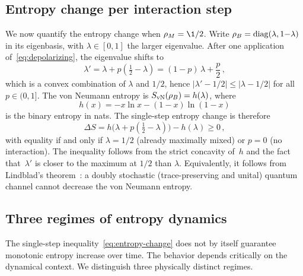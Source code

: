 \subsection{Entropy change per interaction step}\label{sec:entropy-step}

We now quantify the entropy change when $\rho_M = \1/2$.
Write $\rho_B = \operatorname{diag}(\lambda, 1{-}\lambda)$ in its eigenbasis,
with $\lambda \in [0,1]$ the larger eigenvalue.  After one
application of~\eqref{eq:depolarizing}, the eigenvalue shifts to
\begin{equation}
  \lambda' = \lambda + p\!\left(\tfrac{1}{2} - \lambda\right)
  = (1-p)\,\lambda + \frac{p}{2} \,,
  \label{eq:eigenvalue-shift}
\end{equation}
which is a convex combination of $\lambda$ and $1/2$, hence
$|\lambda' - 1/2| \leq |\lambda - 1/2|$ for all
$p \in (0,1]$.  The von Neumann entropy is
$S_{\mathrm{vN}}(\rho_B) = h(\lambda)$, where
\begin{equation}
  h(x) = -x \ln x - (1{-}x)\ln(1{-}x)
  \label{eq:binary-entropy}
\end{equation}
is the binary entropy in nats.  The single-step entropy change is
therefore
\begin{equation}
  \Delta S = h\!\bigl(\lambda + p(\tfrac{1}{2} - \lambda)\bigr)
    - h(\lambda) \geq 0 \,,
  \label{eq:entropy-change}
\end{equation}
with equality if and only if $\lambda = 1/2$ (already maximally
mixed) or $p = 0$ (no interaction).  The inequality follows from the
strict concavity of~$h$ and the fact that~$\lambda'$ is closer
to the maximum at $1/2$ than $\lambda$.  Equivalently, it follows
from Lindblad's theorem~\cite{Lindblad1975}: a doubly stochastic
(trace-preserving and unital) quantum channel cannot decrease the
von Neumann entropy.

\subsection{Three regimes of entropy
  dynamics}\label{sec:three-regimes}

The single-step inequality~\eqref{eq:entropy-change} does not by
itself guarantee monotonic entropy increase over time.  The behavior
depends critically on the dynamical context.  We distinguish three
physically distinct regimes.

